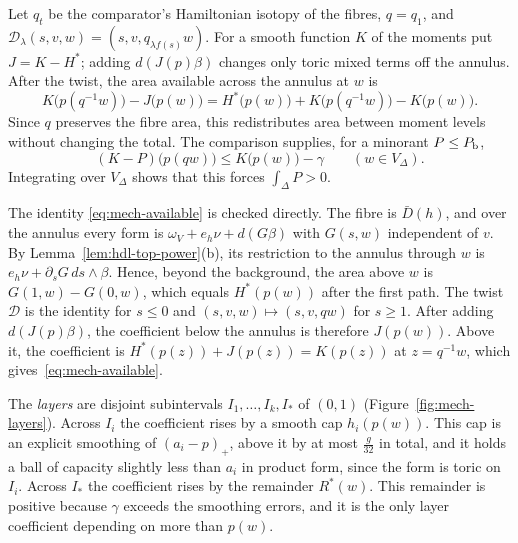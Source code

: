 Let $q_t$ be the comparator's Hamiltonian isotopy of the fibres, $q=q_1$, and $\mathcal D_\lambda(s,v,w)=(s,v,q_{\lambda f(s)}w)$. For a smooth function $K$ of the moments put $J=K-H^*$; adding $d(J(p)\beta)$ changes only toric mixed terms off the annulus. After the twist, the area available across the annulus at $w$ is
\begin{equation}\label{eq:mech-available}
 K\big(p(q^{-1}w)\big)-J\big(p(w)\big)
 =H^*\big(p(w)\big)+K\big(p(q^{-1}w)\big)-K\big(p(w)\big).
\end{equation}
Since $q$ preserves the fibre area, this redistributes area between moment levels without changing the total. The comparison supplies, for a minorant $P\le P_{\mathrm b}$,
\begin{equation}\label{eq:mech-comparison}
 (K-P)\big(p(qw)\big)\le K\big(p(w)\big)-\gamma\qquad(w\in V_\Delta).
\end{equation}
Integrating over $V_\Delta$ shows that this forces $\int_\Delta P>0$.

The identity \eqref{eq:mech-available} is checked directly. The fibre is $\bar D(h)$, and over the annulus every form is $\omega_V+e_h\nu+d(G\beta)$ with $G(s,w)$ independent of $v$. By Lemma~\ref{lem:hdl-top-power}(b), its restriction to the annulus through $w$ is $e_h\nu+\partial_sG\,ds\wedge\beta$. Hence, beyond the background, the area above $w$ is $G(1,w)-G(0,w)$, which equals $H^*(p(w))$ after the first path. The twist $\mathcal D$ is the identity for $s\le0$ and $(s,v,w)\mapsto(s,v,qw)$ for $s\ge1$. After adding $d(J(p)\beta)$, the coefficient below the annulus is therefore $J(p(w))$. Above it, the coefficient is $H^*(p(z))+J(p(z))=K(p(z))$ at $z=q^{-1}w$, which gives~\eqref{eq:mech-available}.

The \emph{layers} are disjoint subintervals $I_1,\dots,I_k,I_*$ of $(0,1)$ (Figure~\ref{fig:mech-layers}). Across $I_i$ the coefficient rises by a smooth cap $h_i(p(w))$. This cap is an explicit smoothing of $(a_i-p)_+$, above it by at most $\frac g{32}$ in total, and it holds a ball of capacity slightly less than $a_i$ in product form, since the form is toric on $I_i$. Across $I_*$ the coefficient rises by the remainder $R^*(w)$. This remainder is positive because $\gamma$ exceeds the smoothing errors, and it is the only layer coefficient depending on more than $p(w)$.

